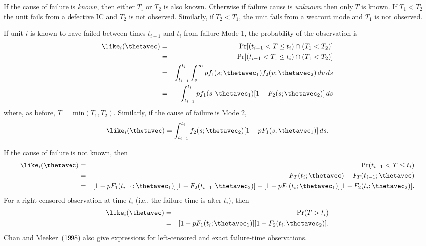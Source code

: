 If the cause of failure is {\em known}, then either $T_{1}$ or
$T_{2}$ is also known.  Otherwise if failure cause is {\em unknown}
then only $T$ is known.  If $T_{1}<T_{2}$ the unit fails from a
defective IC and $T_{2}$ is not observed. Similarly, if
$T_{2}<T_{1}$, the unit fails from a wearout mode and $T_{1}$ is not
observed.

If unit $i$ is known to have failed between times $t_{i-1}$ and
$t_{i}$ from failure Mode 1, the probability of the
observation is 
\begin{eqnarray*} 
\like_{i}(\thetavec) &=&
\Pr[(t_{i-1} < T \leq t_{i})
\cap (T_{1}<T_{2})] \\
               &=& \Pr[(t_{i-1} < T_{1} \leq t_{i}) \cap 
                               (T_{1}<T_{2})] \\   
                       &=& \int_{t_{i-1}}^{t_{i}}
\int_{s}^{\infty} pf_{1}(s;\thetavec_{1})f_{2}
             (v;\thetavec_{2})\,dv\,ds \\ &=&
          \int_{t_{i-1}}^{t_{i}} p f_{1}(s;\thetavec_{1})
          [1-F_{2}(s;\thetavec_{2})]\,ds
\end{eqnarray*} 
where, as before, $T =$ min$(T_{1},T_{2}).$ Similarly, if the cause
of failure is Mode 2, 
\begin{displaymath}
\like_{i}(\thetavec) =
\int_{t_{i-1}}^{t_{i}}f_{2}(s;\thetavec_{2})
	[1-pF_{1}(s;\thetavec_{1})]\,ds.
\end{displaymath}

If the cause of failure is not known, then
\begin{eqnarray*}
      \like_{i}(\thetavec) &=& \Pr(t_{i-1} < T \leq t_{i}) \\
    &=& F_{T}(t_{i};\thetavec)- F_{T}(t_{i-1};\thetavec) \\
    &=& [1 - pF_{1}(t_{i-1};\thetavec_{1})][1 -F_{2}(t_{i-1};
\thetavec_{2})] 
- [1 - pF_{1}(t_{i};\thetavec_{1})][1 - F_{2}(t_{i};\thetavec_{2})].
\end{eqnarray*}
For a right-censored observation at time $t_{i}$ (i.e., the failure
time is after $t_{i}$), then
\begin{eqnarray*}   
     \like_{i}(\thetavec) &=& \Pr(T > t_{i}) \\ &=&
   [1-pF_{1}(t_{i};\thetavec_{1})][1-F_{2}(t_{i};\thetavec_{2})].
\end{eqnarray*} 
Chan and Meeker~(1998) also give expressions for left-censored and
exact failure-time observations.

